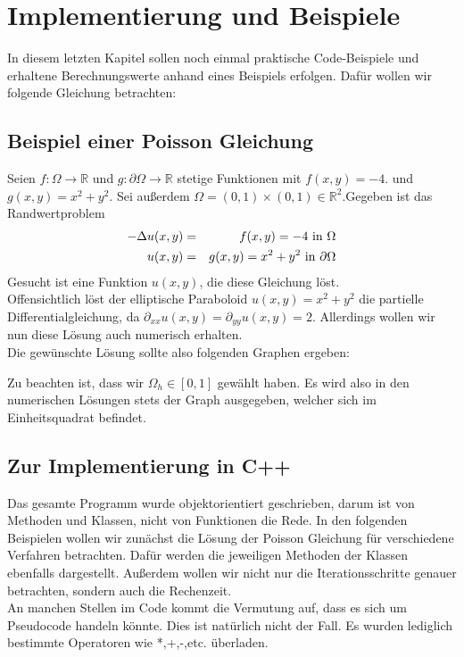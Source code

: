 \chapter{Implementierung und Beispiele}\label{c.Vergleich}

In diesem letzten Kapitel sollen noch einmal praktische Code-Beispiele und erhaltene Berechnungswerte anhand eines Beispiels erfolgen. Dafür wollen wir folgende Gleichung betrachten:

\section{Beispiel einer Poisson Gleichung}\label{s.Beispiel einer Poisson Gleichung}

Seien $f: \Omega \rightarrow \mathbb{R}$ und $g: \partial\Omega \rightarrow \mathbb{R}$ stetige Funktionen mit $f(x,y) = -4.$ und $g(x,y) = x^{2} + y^{2}$. Sei außerdem $\Omega = (0,1)\times(0,1) \in \mathbb{R}^{2}$.Gegeben ist das Randwertproblem
\begin{eqnarray}
        -\Delta u(x,y) &=& f(x,y) = -4 \textnormal{ in } \Omega \\
    u(x,y) &=& g(x,y) = x^{2} + y^{2} \textnormal{ in } \partial \Omega
\end{eqnarray}
Gesucht ist eine Funktion $u(x,y)$, die diese Gleichung löst. \\
Offensichtlich löst der elliptische Paraboloid $u(x,y) = x^{2} + y^{2}$ die partielle Differentialgleichung, da $\partial_{xx}u(x,y) = \partial_{yy}u(x,y) = 2$. Allerdings wollen wir nun diese Lösung auch numerisch erhalten.\\
Die gewünschte Lösung sollte also folgenden Graphen ergeben:


Zu beachten ist, dass wir $\Omega_{h} \in [0,1]$ gewählt haben. Es wird also in den numerischen Lösungen stets der Graph ausgegeben, welcher sich im Einheitsquadrat befindet.\\

\section{Zur Implementierung in C++}

Das gesamte Programm wurde objektorientiert geschrieben, darum ist von Methoden und Klassen, nicht von Funktionen die Rede. In den folgenden Beispielen wollen wir zunächst die Lösung der Poisson Gleichung für verschiedene Verfahren betrachten. Dafür werden die jeweiligen Methoden der Klassen ebenfalls dargestellt. Außerdem wollen wir nicht nur die Iterationsschritte genauer betrachten, sondern auch die Rechenzeit.\\
An manchen Stellen im Code kommt die Vermutung auf, dass es sich um Pseudocode handeln könnte. Dies ist natürlich nicht der Fall. Es wurden lediglich bestimmte Operatoren wie *,+,-,etc. überladen.

